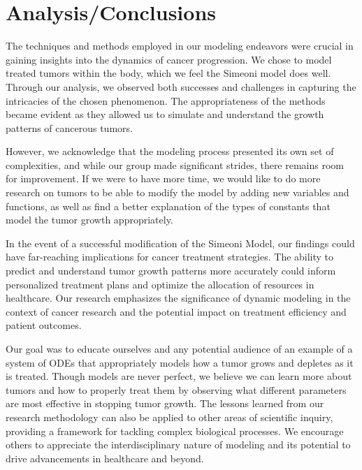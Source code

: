 \documentclass[11pt,reqno]{amsart}
\begin{document}
\section{Analysis/Conclusions}
The techniques and methods employed in our modeling endeavors were crucial in gaining insights into the dynamics of cancer progression. We chose to model treated tumors within the body, which we feel the Simeoni model does well. Through our analysis, we observed both successes and challenges in capturing the intricacies of the chosen phenomenon. The appropriateness of the methods became evident as they allowed us to simulate and understand the growth patterns of cancerous tumors. 

However, we acknowledge that the modeling process presented its own set of complexities, and while our group made significant strides, there remains room for improvement. If we were to have more time, we would like to do more research on tumors to be able to modify the model by adding new variables and functions, as well as find a better explanation of the types of constants that model the tumor growth appropriately. 

In the event of a successful modification of the Simeoni Model, our findings could have far-reaching implications for cancer treatment strategies. The ability to predict and understand tumor growth patterns more accurately could inform personalized treatment plans and optimize the allocation of resources in healthcare. Our research emphasizes the significance of dynamic modeling in the context of cancer research and the potential impact on treatment efficiency and patient outcomes. 

Our goal was to educate ourselves and any potential audience of an example of a system of ODEs that appropriately models how a tumor grows and depletes as it is treated. Though models are never perfect, we believe we can learn more about tumors and how to properly treat them by observing what different parameters are most effective in stopping tumor growth. The lessons learned from our research methodology can also be applied to other areas of scientific inquiry, providing a framework for tackling complex biological processes. We encourage others to appreciate the interdisciplinary nature of modeling and its potential to drive advancements in healthcare and beyond.


\end{document}
